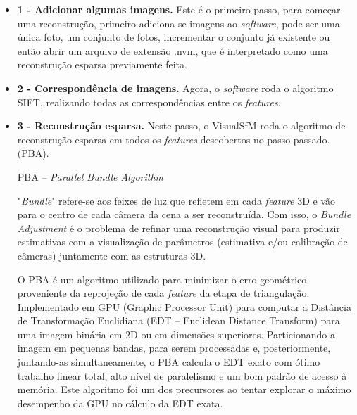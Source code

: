 \begin{itemize}
\item \textbf{1 - Adicionar algumas imagens.} Este é o primeiro passo, para começar uma reconstrução, primeiro adiciona-se imagens ao {\it software}, pode ser uma única foto, um conjunto de fotos, incrementar o conjunto já existente ou então abrir um arquivo de extensão .nvm, que é interpretado como uma reconstrução esparsa previamente feita.

\item \textbf{2 - Correspondência de imagens.} Agora, o {\it software} roda o algoritmo SIFT, realizando todas as correspondências entre os {\it features}.

\item \textbf{3 - Reconstrução esparsa.} Neste passo, o VisualSfM roda o algoritmo de reconstrução esparsa em todos os {\it features} descobertos no passo passado. (PBA). %


PBA -- {\it Parallel Bundle Algorithm}

"{\it Bundle}" refere-se aos feixes de luz que refletem em cada {\it feature} 3D e vão para o centro de cada câmera da cena a ser reconstruída. Com isso, o {\it Bundle Adjustment} é o problema de refinar uma reconstrução visual para produzir estimativas com a visualização de parâmetros (estimativa e/ou calibração de câmeras) juntamente com as estruturas 3D.

O PBA é um algoritmo utilizado para minimizar o erro geométrico proveniente da reprojeção de cada {\it feature} da etapa de triangulação. Implementado em GPU (Graphic Processor Unit) para computar a Distância de Transformação Euclidiana (EDT -- Euclidean Distance Transform) para uma imagem binária em 2D ou em dimensões superiores. Particionando a imagem em pequenas bandas, para serem processadas e, posteriormente, juntando-as simultaneamente, o PBA calcula o EDT exato com ótimo trabalho linear total, alto nível de paralelismo e um bom padrão de acesso à memória. Este algoritmo foi um dos precursores ao tentar explorar o máximo desempenho da GPU no cálculo da EDT exata. 





\end{itemize}
